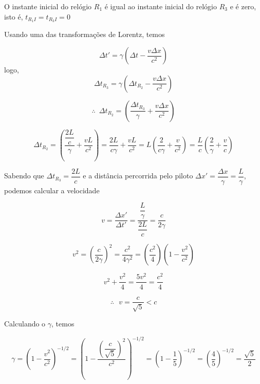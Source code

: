 \documentclass[10pt,a4paper]{article}
\begin{document}
\begin{enumerate}
	O instante inicial do relógio $ R_1 $ é igual ao instante inicial do relógio $ R_3 $ e é zero, isto é, $ t_{R_1I} = t_{R_3I} = 0  $
	
	Usando uma das transformações de Lorentz, temos
	
	\begin{equation*}
		\Delta t' = \gamma ( \Delta t - \frac{v \Delta x}{c^2})
	\end{equation*}
	logo,
	\begin{equation*}
		\Delta t_{R_3} = \gamma ( \Delta t_{R_2} - \dfrac{v \Delta x}{c^2})
	\end{equation*}

	\begin{equation*}
		\therefore \,\,\,\Delta t_{R_2} =  ( \dfrac{\Delta t_{R_3}}{\gamma} + \dfrac{v \Delta x}{c^2})
	\end{equation*}

	\begin{equation*}
		\Delta t_{R_2} =  ( \dfrac{\dfrac{2L}{c}}{\gamma} + \dfrac{v L}{c^2}) = \dfrac{2L}{c\gamma} + \frac{vL}{c^2} = L (\dfrac{2}{c\gamma} + \dfrac{v}{c^2}) = \dfrac{L}{c} (\dfrac{2}{\gamma} + \dfrac{v}{c})
	\end{equation*}

	Sabendo que $ \Delta t_{R_3} = \dfrac{2L}{c} $ e a distância percorrida pelo piloto $ \Delta x\prime = \dfrac{\Delta x}{\gamma} = \dfrac{L}{\gamma} $, podemos calcular a velocidade
	
	\begin{equation*}
		v = \dfrac{\Delta x\prime}{\Delta t\prime} = \dfrac{\dfrac{L}{\gamma}}{\dfrac{2L}{c}} = \dfrac{c}{2\gamma}
	\end{equation*}

	\begin{equation*}
		v^2 = (\dfrac{c}{2\gamma})^2 = \dfrac{c^2}{4\gamma^2} = (\dfrac{c^2}{4}) (1 - \dfrac{v^2}{c^2})
	\end{equation*}

	\begin{equation*}
		v^2 + \dfrac{v^2}{4}= \dfrac{5v^2}{4}=  \dfrac{c^2}{4}
	\end{equation*}
	
	\begin{equation*}
	 \therefore	\,\,\,\, v  = \dfrac{c}{\sqrt{5}} < c
	\end{equation*}

	Calculando o $ \gamma $, temos
	
	\begin{equation*}
		\gamma = (1-\dfrac{v^2}{c^2})^{-1/2} = (1-\dfrac{(\dfrac{c}{\sqrt{5}})^2}{c^2})^{-1/2} =(1-\dfrac{1}{5})^{-1/2} = (\dfrac{4}{5})^{-1/2} = \dfrac{\sqrt{5}}{2}
	\end{equation*}


\end{enumerate}
\end{document}
